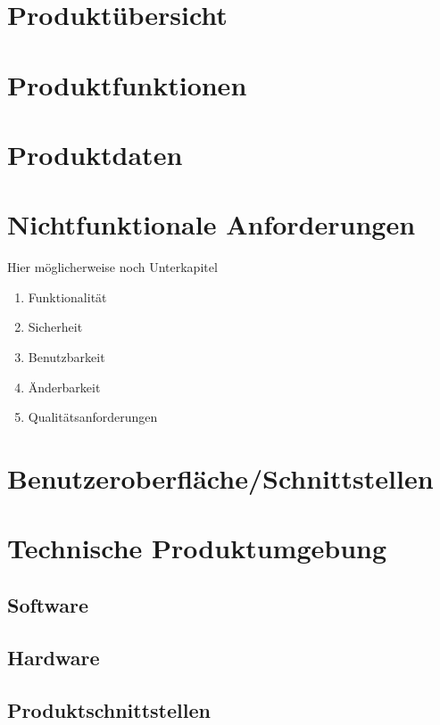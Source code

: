 \documentclass[parskip=full]{scrartcl}
\begin{document}
\section{Produktübersicht}
\newpage



\section{Produktfunktionen}
\newpage



\section{Produktdaten}
\newpage



\section{Nichtfunktionale Anforderungen}
Hier möglicherweise noch Unterkapitel
\begin{enumerate}
    \item Funktionalität
    \item Sicherheit
    \item Benutzbarkeit
    \item Änderbarkeit
    \item Qualitätsanforderungen
\end{enumerate}
\newpage



\section{Benutzeroberfläche/Schnittstellen}
\newpage



\section{Technische Produktumgebung}

\subsection{Software}
\subsection{Hardware}
\subsection{Produktschnittstellen}
\newpage
\end{document}
